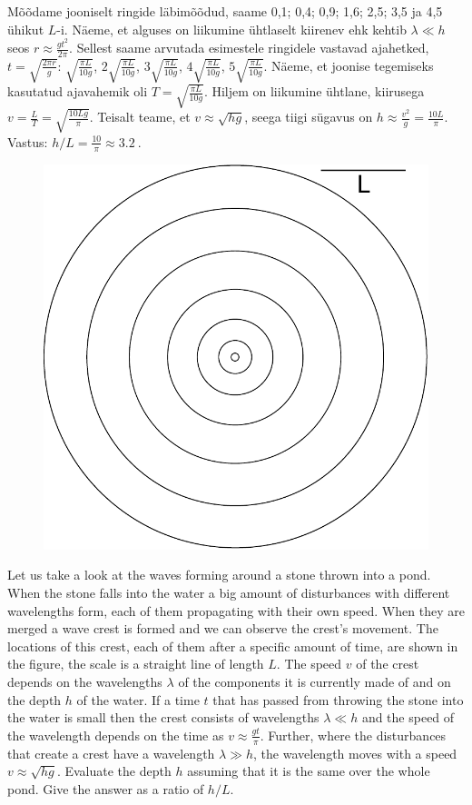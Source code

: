 {\ifSolution
Mõõdame jooniselt ringide läbimõõdud, saame 0,1; 0,4; 0,9; 1,6; 2,5; 3,5 ja 4,5 ühikut $L$-i. Näeme, et alguses on liikumine ühtlaselt kiirenev ehk kehtib $\lambda \ll h$ seos $r \approx \frac{gt^2}{2 \pi}$. Sellest saame arvutada esimestele ringidele vastavad ajahetked, $t = \sqrt{\frac{2 \pi r}{g}}$: $\sqrt{\frac{\pi L}{10 g}}$, $2 \sqrt{\frac{\pi L}{10 g}}$, $3 \sqrt{\frac{\pi L}{10 g}}$, $4 \sqrt{\frac{\pi L}{10 g}}$, $5 \sqrt{\frac{\pi L}{10 g}}$. Näeme, et joonise tegemiseks kasutatud ajavahemik oli $T=\sqrt{\frac{\pi L}{10 g}}$.
Hiljem on liikumine ühtlane, kiirusega $v=\frac{L}{T}=\sqrt{\frac{10 L g}{\pi}}$. Teisalt teame, et $v \approx \sqrt{hg}$, seega tiigi sügavus on $h \approx \frac{v^2}{g} = \frac{10 L}{\pi}$. Vastus: $h/L = \frac{10}{\pi} \approx \SI{3,2}{}$.
\fi


\ifEngStatement
\begin{figure}%
\includegraphics[width=\linewidth]{2013-v3g-06-lained}%
\end{figure}
Let us take a look at the waves forming around a stone thrown into a pond. When the stone falls into the water a big amount of disturbances with different wavelengths form, each of them propagating with their own speed. When they are merged a wave crest is formed and we can observe the crest’s movement. The locations of this crest, each of them after a specific amount of time, are shown in the figure, the scale is a straight line of length $L$. The speed $v$ of the crest depends on the wavelengths $\lambda$ of the components it is currently made of and on the depth $h$ of the water. If a time $t$ that has passed from throwing the stone into the water is small then the crest consists of wavelengths $\lambda \ll h$ and the speed of the wavelength depends on the time as $v \approx \frac{gt}{\pi}$. Further, where the disturbances that create a crest have a wavelength $\lambda \gg h$, the wavelength moves with a speed $v
\approx \sqrt{hg}$. Evaluate the depth $h$ assuming that it is the same over the whole pond. Give the answer as a ratio of $h/L$.
\fi


}
